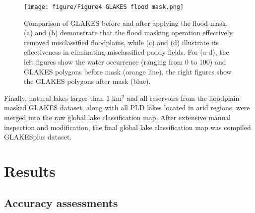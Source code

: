 \documentclass[preprint,12pt,authoryear]{elsarticle}
\begin{document}
\begin{figure}[h]
    \centering
    \texttt{[image: figure/Figure4 GLAKES flood mask.png]}
    \caption{Comparison of GLAKES before and after applying the flood mask. (a) and (b) demonstrate that the flood masking operation effectively removed misclassified floodplains, while (c) and (d) illustrate its effectiveness in eliminating misclassified paddy fields. For (a-d), the left figures show the water occurrence (ranging from 0 to 100) and GLAKES polygons before mask (orange line), the right figures show the GLAKES polygons after mask (blue).}
    \label{fig:Fig4}
\end{figure}

Finally, natural lakes larger than 1 km$^2$ and all reservoirs from the floodplain-masked GLAKES dataset, along with all PLD lakes located in arid regions, were merged into the raw global lake classification map. After extensive manual inspection and modification, the final global lake classification map was compiled GLAKESplus dataset.

\section{Results}
\label{sec3}

\subsection{Accuracy assessments}
\label{subsec31}
\end{document}
